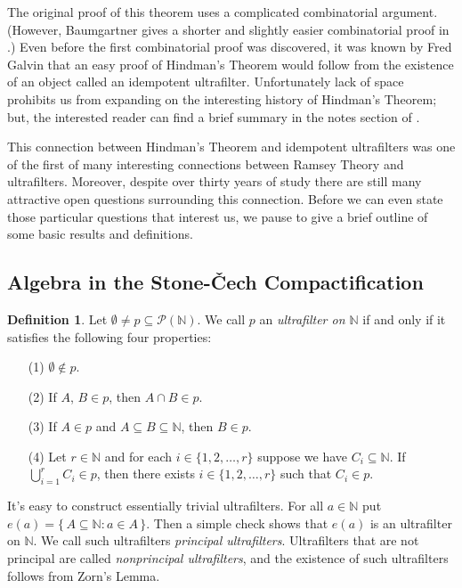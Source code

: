 \documentclass[12pt]{article}
\theoremstyle{plain}
\theoremstyle{definition}
\newtheorem{defn}[thm]{Definition}
\newcommand{\bbN}{\mathbb{N}}
\begin{document}
The original proof of this theorem uses a complicated combinatorial
argument. 
(However, Baumgartner gives a shorter and slightly easier
combinatorial proof in \cite{Baumgartner:1974uq}.)
Even before the first combinatorial proof was discovered, it was known
by Fred Galvin that an easy proof of Hindman's Theorem would follow
from the existence of an object called an idempotent ultrafilter.
Unfortunately lack of space prohibits us from expanding on the
interesting history of Hindman's Theorem; but, the interested reader
can find a brief summary in the notes section of \cite[Chapter
5]{Hindman:1998fk}.

This connection between Hindman's Theorem and idempotent ultrafilters
was one of the first of many interesting connections between Ramsey
Theory and ultrafilters.
Moreover, despite over thirty years of study there are still many
attractive open questions surrounding this connection. 
Before we can even state those particular questions that interest us,
we pause to give a brief outline of some basic results and
definitions. 

\subsection{Algebra in the Stone-\v{C}ech Compactification}
\begin{defn}
  \label{defn:uf}
  Let $\emptyset \ne p \subseteq \mathcal{P}(\bbN)$.
  We call $p$ an \textsl{ultrafilter on $\bbN$} if and only if it
  satisfies the following four properties:
  \begin{itemize}
    \item[(1)] $\emptyset \not\in p$.
    \item[(2)] If $A$, $B \in p$, then $A \cap B \in p$.
    \item[(3)] If $A \in p$ and $A \subseteq B \subseteq \bbN$,
      then $B \in p$.
    \item[(4)] Let $r \in \bbN$ and for each $i \in \{1, 2,
      \ldots, r\}$ suppose we have $C_i \subseteq \bbN$. 
      If $\bigcup_{i=1}^r C_i \in p$, then there exists $i \in
      \{1, 2, \ldots, r\}$ such that $C_i \in p$.
  \end{itemize}
\end{defn}

It's easy to construct essentially trivial ultrafilters. 
For all $a \in \bbN$ put $e(a) = \{\, A \subseteq \bbN : a \in A
\,\}$.
Then a simple check shows that $e(a)$ is an ultrafilter on $\bbN$.
We call such ultrafilters \textsl{principal ultrafilters}. 
Ultrafilters that are not principal are called \textsl{nonprincipal
  ultrafilters}, and the existence of such ultrafilters follows from
Zorn's Lemma. 
\end{document}
